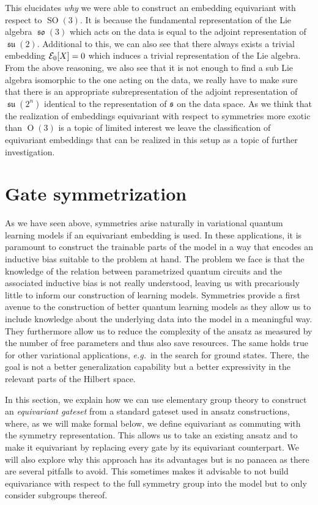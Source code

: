 \documentclass[a4paper,twocolumn,notitlepage,nofootinbib,superscriptaddress,floatfix]{revtex4-2}
\newcommand{\eg}{\textit{e.g.}\ }
\DeclareMathOperator{\SO}{\ensuremath{SO}}
\renewcommand{\O}{\ensuremath{\operatorname{O}}}
\DeclareMathOperator{\so}{\ensuremath{\mathfrak{so}}}
\DeclareMathOperator{\su}{\ensuremath{\mathfrak{su}}}
\begin{document}
This elucidates \emph{why} we were able to construct an embedding equivariant with respect to $\SO(3)$. It is because the fundamental representation of the Lie algebra $\so(3)$ which acts on the data is equal to the adjoint representation of $\su(2)$. Additional to this, we can also see that there always exists a trivial embedding $\mathcal{E}_0[X] = 0$ which induces a trivial representation of the Lie algebra. From the above reasoning, we also see that it is not enough to find a sub Lie algebra isomorphic to the one acting on the data, we really have to make sure that there is an appropriate subrepresentation of the adjoint representation of $\su(2^n)$ identical to the representation of $\mathfrak{s}$ on the data space.
As we think that the realization of embeddings equivariant with respect to symmetries more exotic than $\O(3)$ is a topic of limited interest we leave the classification of equivariant embeddings that can be realized in this setup as a topic of further investigation.

\section{Gate symmetrization \label{sec:gateSymmetrization}}

As we have seen above, symmetries arise naturally in variational quantum learning models if an equivariant embedding is used. In these applications, it is paramount to construct the trainable parts of the model in a way that encodes an inductive bias suitable to the problem at hand. The problem we face is that the knowledge of the relation between parametrized quantum circuits and the associated inductive bias is not really understood, leaving us with precariously little to inform our construction of learning models. Symmetries provide a first avenue to the construction of better quantum learning models as they allow us to include knowledge about the underlying data into the model in a meaningful way. They furthermore allow us to reduce the complexity of the ansatz as measured by the number of free parameters and thus also save resources. The same holds true for other variational applications, \eg in the search for ground states. There, the goal is not a better generalization capability but a better expressivity in the relevant parts of the Hilbert space.

In this section, we explain how we can use elementary group theory to construct an \emph{equivariant gateset} from a standard gateset used in ansatz constructions, where, as we will make formal below, we define equivariant as commuting with the symmetry representation.
This allows us to take an existing ansatz and to make it equivariant by replacing every gate by its equivariant counterpart. We will also explore why this approach has its advantages but is no panacea as there are several pitfalls to avoid. This sometimes makes it advisable to not build equivariance with respect to the full symmetry group into the model but to only consider subgroups thereof.
\end{document}
